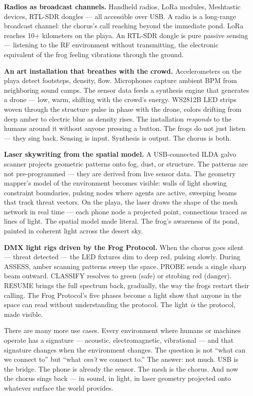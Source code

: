 \documentclass[11pt,letterpaper]{article}
\begin{document}
\textbf{Radios as broadcast channels.} Handheld radios, LoRa modules, Meshtastic devices, RTL-SDR dongles --- all accessible over USB. A radio is a long-range broadcast channel: the chorus's call reaching beyond the immediate pond. LoRa reaches 10+ kilometers on the playa. An RTL-SDR dongle is pure passive sensing --- listening to the RF environment without transmitting, the electronic equivalent of the frog feeling vibrations through the ground.

\textbf{An art installation that breathes with the crowd.} Accelerometers on the playa detect footsteps, density, flow. Microphones capture ambient BPM from neighboring sound camps. The sensor data feeds a synthesis engine that generates a drone --- low, warm, shifting with the crowd's energy. WS2812B LED strips woven through the structure pulse in phase with the drone, colors drifting from deep amber to electric blue as density rises. The installation \textit{responds} to the humans around it without anyone pressing a button. The frogs do not just listen --- they sing back. Sensing is input. Synthesis is output. The chorus is both.

\textbf{Laser skywriting from the spatial model.} A USB-connected ILDA galvo scanner projects geometric patterns onto fog, dust, or structure. The patterns are not pre-programmed --- they are derived from live sensor data. The geometry mapper's model of the environment becomes visible: walls of light showing constraint boundaries, pulsing nodes where agents are active, sweeping beams that track threat vectors. On the playa, the laser draws the shape of the mesh network in real time --- each phone node a projected point, connections traced as lines of light. The spatial model made literal. The frog's awareness of its pond, painted in coherent light across the desert sky.

\textbf{DMX light rigs driven by the Frog Protocol.} When the chorus goes silent --- threat detected --- the LED fixtures dim to deep red, pulsing slowly. During ASSESS, amber scanning patterns sweep the space. PROBE sends a single sharp beam outward. CLASSIFY resolves to green (safe) or strobing red (danger). RESUME brings the full spectrum back, gradually, the way the frogs restart their calling. The Frog Protocol's five phases become a light show that anyone in the space can read without understanding the protocol. The light \textit{is} the protocol, made visible.

There are many more use cases. Every environment where humans or machines operate has a signature --- acoustic, electromagnetic, vibrational --- and that signature changes when the environment changes. The question is not ``what can we connect to'' but ``what \textit{can't} we connect to.'' The answer: not much. USB is the bridge. The phone is already the sensor. The mesh is the chorus. And now the chorus sings back --- in sound, in light, in laser geometry projected onto whatever surface the world provides.
\end{document}
